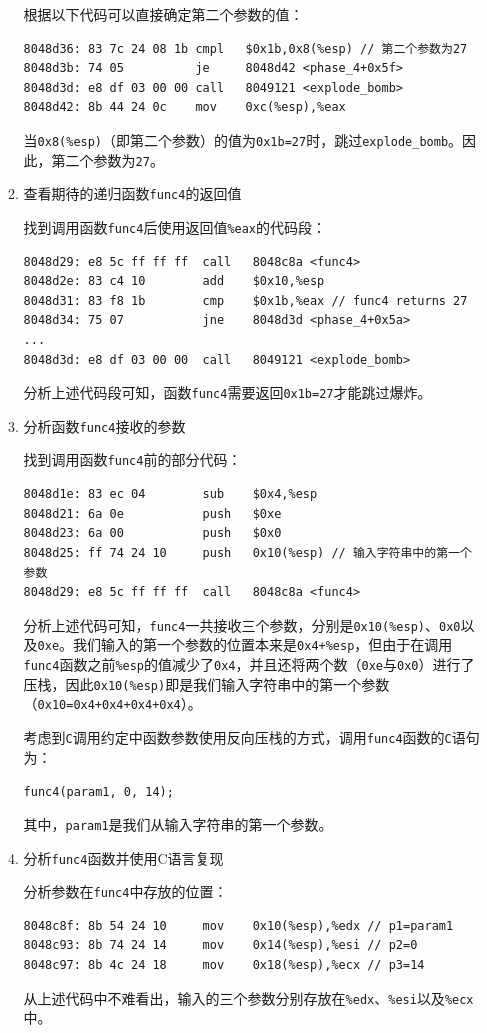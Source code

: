 \documentclass{paper}
\begin{document}
\begin{enumerate}
\begin{enumerate}
根据以下代码可以直接确定第二个参数的值：
\begin{lstlisting}
8048d36: 83 7c 24 08 1b cmpl   $0x1b,0x8(%esp) // 第二个参数为27
8048d3b: 74 05          je     8048d42 <phase_4+0x5f>
8048d3d: e8 df 03 00 00 call   8049121 <explode_bomb>
8048d42: 8b 44 24 0c    mov    0xc(%esp),%eax
\end{lstlisting}
当\verb|0x8(%esp)|（即第二个参数）的值为\verb|0x1b=27|时，跳过\verb|explode_bomb|。因此，第二个参数为\verb|27|。


\item 查看期待的递归函数\verb|func4|的返回值

找到调用函数\verb|func4|后使用返回值\verb|%eax|的代码段：
\begin{lstlisting}
8048d29: e8 5c ff ff ff  call   8048c8a <func4>
8048d2e: 83 c4 10        add    $0x10,%esp
8048d31: 83 f8 1b        cmp    $0x1b,%eax // func4 returns 27
8048d34: 75 07           jne    8048d3d <phase_4+0x5a>
...
8048d3d: e8 df 03 00 00  call   8049121 <explode_bomb>
\end{lstlisting}
分析上述代码段可知，函数\verb|func4|需要返回\verb|0x1b=27|才能跳过爆炸。

\item 分析函数\verb|func4|接收的参数

找到调用函数\verb|func4|前的部分代码：
\begin{lstlisting}
8048d1e: 83 ec 04        sub    $0x4,%esp
8048d21: 6a 0e           push   $0xe
8048d23: 6a 00           push   $0x0
8048d25: ff 74 24 10     push   0x10(%esp) // 输入字符串中的第一个参数
8048d29: e8 5c ff ff ff  call   8048c8a <func4>
\end{lstlisting}
分析上述代码可知，\verb|func4|一共接收三个参数，分别是\verb|0x10(%esp)|、\verb|0x0|以及\verb|0xe|。我们输入的第一个参数的位置本来是\verb|0x4+%esp|，但由于在调用\verb|func4|函数之前\verb|%esp|的值减少了\verb|0x4|，并且还将两个数（\verb|0xe|与\verb|0x0|）进行了压栈，因此\verb|0x10(%esp)|即是我们输入字符串中的第一个参数（\verb|0x10=0x4+0x4+0x4+0x4|）。

考虑到\verb|C|调用约定中函数参数使用反向压栈的方式，调用\verb|func4|函数的\verb|C|语句为：

\verb|func4(param1, 0, 14);|

其中，\verb|param1|是我们从输入字符串的第一个参数。

\item 分析\verb|func4|函数并使用C语言复现

分析参数在\verb|func4|中存放的位置：
\begin{lstlisting}
8048c8f: 8b 54 24 10     mov    0x10(%esp),%edx // p1=param1
8048c93: 8b 74 24 14     mov    0x14(%esp),%esi // p2=0
8048c97: 8b 4c 24 18     mov    0x18(%esp),%ecx // p3=14
\end{lstlisting}
从上述代码中不难看出，输入的三个参数分别存放在\verb|%edx|、\verb|%esi|以及\verb|%ecx|中。


\end{enumerate}
\end{enumerate}
\end{document}
